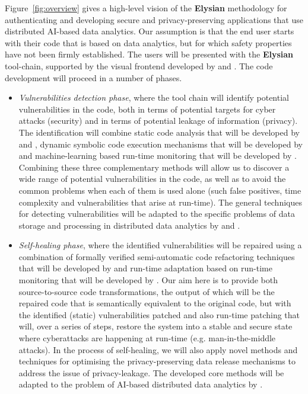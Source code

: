 \documentclass[a4paper,11pt]{article}
\newcommand{\project}[1]{\textbf{#1}\xspace}
\newcommand{\SECURITY}{\project{Elysian}}
\newcommand{\TheProject}{\SECURITY}
\begin{document}
Figure~\ref{fig:overview} gives a high-level vision of the \TheProject{} methodology for authenticating and developing secure and privacy-preserving applications that use distributed AI-based data analytics. Our assumption is that the end user starts with their code that is based on data analytics, but for which safety properties have not been firmly established. The users will be presented with the \TheProject{} tool-chain, supported by the visual frontend developed by \USTANshort{} and \YAGshort{}. The code development will proceed in a number of phases.

\begin{itemize}
\item \emph{Vulnerabilities detection phase}, where the tool chain will identify potential vulnerabilities in the code, both in terms of potential targets for cyber attacks (security) and in terms of potential leakage of information (privacy). The identification will combine static code analysis that will be developed by \YAGshort{} and \UCMshort{}, dynamic symbolic code execution mechanisms that will be developed by \IBMshort{} and machine-learning based run-time monitoring that will be developed by \SCCHshort{}. Combining these three complementary methods will allow us to discover a wide range of potential vulnerabilities in the code, as well as to avoid the common problems when each of them is used alone (such false positives, time complexity and vulnerabilities that arise at run-time). The general techniques for detecting vulnerabilities will be adapted to the specific problems of data storage and processing in distributed data analytics by \UODshort{} and \SCCHshort{}. 

\item \emph{Self-healing phase}, where the identified vulnerabilities will be repaired using a combination of formally verified semi-automatic code refactoring techniques that will be developed by \SAshort{} and run-time adaptation based on run-time monitoring that will be developed by \SCCHshort{}. Our aim here is to provide both source-to-source code transformations, the output of which will be the repaired code that is semantically equivalent to the original code, but with the identified (static) vulnerabilities patched and also run-time patching that will, over a series of steps, restore the system into a stable and secure state where cyberattacks are happening at run-time (e.g. man-in-the-middle attacks). In the process of self-healing, we will also apply novel methods and techniques for optimising the privacy-preserving data release mechanisms to address the issue of privacy-leakage. The developed core methods will be adapted to the problem of AI-based distributed data analytics by \UODshort{}. 



\end{itemize}
\end{document}

